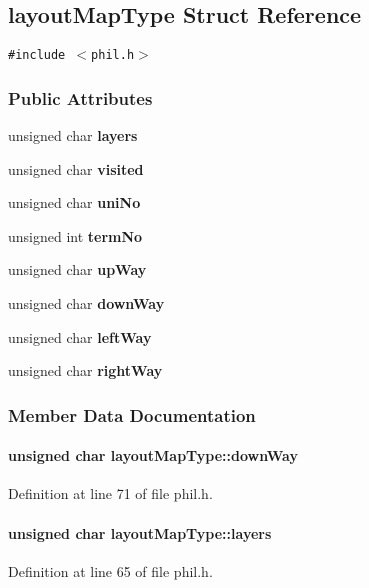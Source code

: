 \subsection{layout\-Map\-Type  Struct Reference}
\label{layoutMapType}
{\tt \#include $<$phil.h$>$}

\subsubsection*{Public Attributes}
\begin{CompactItemize}
\item 
unsigned char {\bf layers}
\item 
unsigned char {\bf visited}
\item 
unsigned char {\bf uni\-No}
\item 
unsigned int {\bf term\-No}
\item 
unsigned char {\bf up\-Way}
\item 
unsigned char {\bf down\-Way}
\item 
unsigned char {\bf left\-Way}
\item 
unsigned char {\bf right\-Way}
\end{CompactItemize}


\subsubsection{Member Data Documentation}
\label{layoutMapType_m5}
\paragraph{\setlength{\rightskip}{0pt plus 5cm}unsigned char layout\-Map\-Type::down\-Way}\hfill



Definition at line 71 of file phil.h.\label{layoutMapType_m0}
\paragraph{\setlength{\rightskip}{0pt plus 5cm}unsigned char layout\-Map\-Type::layers}\hfill



Definition at line 65 of file phil.h.\label{layoutMapType_m6}
